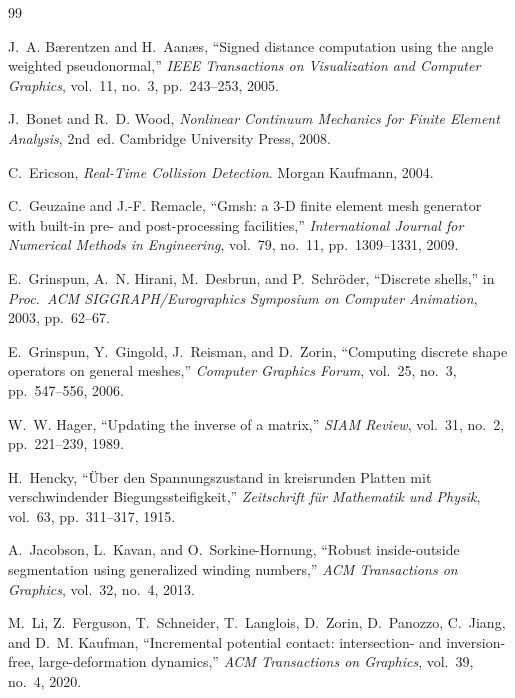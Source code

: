 \documentclass[11pt,a4paper]{article}
\theoremstyle{remark}
\begin{document}
\begin{thebibliography}{99}

J.~A. B{\ae}rentzen and H.~Aan{\ae}s,
``Signed distance computation using the angle weighted pseudonormal,''
\emph{IEEE Transactions on Visualization and Computer Graphics}, vol.~11, no.~3, pp.~243--253, 2005.

J.~Bonet and R.~D. Wood,
\emph{Nonlinear Continuum Mechanics for Finite Element Analysis}, 2nd~ed.
Cambridge University Press, 2008.

C.~Ericson, \emph{Real-Time Collision Detection}. Morgan Kaufmann, 2004.

C.~Geuzaine and J.-F. Remacle,
``Gmsh: a 3-D finite element mesh generator with built-in pre- and post-processing facilities,''
\emph{International Journal for Numerical Methods in Engineering}, vol.~79, no.~11, pp.~1309--1331, 2009.

E.~Grinspun, A.~N. Hirani, M.~Desbrun, and P.~Schr{\"o}der,
``Discrete shells,'' in \emph{Proc.\ ACM SIGGRAPH/Eurographics Symposium on Computer Animation}, 2003, pp.~62--67.

E.~Grinspun, Y.~Gingold, J.~Reisman, and D.~Zorin,
``Computing discrete shape operators on general meshes,''
\emph{Computer Graphics Forum}, vol.~25, no.~3, pp.~547--556, 2006.

W.~W. Hager, ``Updating the inverse of a matrix,''
\emph{SIAM Review}, vol.~31, no.~2, pp.~221--239, 1989.

H.~Hencky, ``{\"U}ber den Spannungszustand in kreisrunden Platten mit verschwindender Biegungssteifigkeit,''
\emph{Zeitschrift f{\"u}r Mathematik und Physik}, vol.~63, pp.~311--317, 1915.

A.~Jacobson, L.~Kavan, and O.~Sorkine-Hornung,
``Robust inside-outside segmentation using generalized winding numbers,''
\emph{ACM Transactions on Graphics}, vol.~32, no.~4, 2013.

M.~Li, Z.~Ferguson, T.~Schneider, T.~Langlois, D.~Zorin, D.~Panozzo, C.~Jiang, and D.~M. Kaufman,
``Incremental potential contact: intersection- and inversion-free, large-deformation dynamics,''
\emph{ACM Transactions on Graphics}, vol.~39, no.~4, 2020.


\end{thebibliography}
\end{document}
